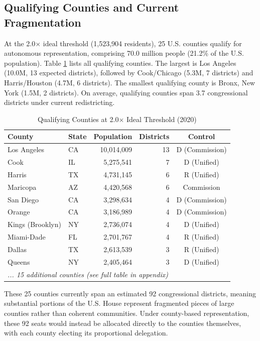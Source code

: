\subsection{Qualifying Counties and Current Fragmentation}

At the 2.0$\times$ ideal threshold (1,523,904 residents), 25 U.S. counties qualify for autonomous representation, comprising 70.0 million people (21.2\% of the U.S. population). Table \ref{tab:qualifying} lists all qualifying counties. The largest is Los Angeles (10.0M, 13 expected districts), followed by Cook/Chicago (5.3M, 7 districts) and Harris/Houston (4.7M, 6 districts). The smallest qualifying county is Bronx, New York (1.5M, 2 districts). On average, qualifying counties span 3.7 congressional districts under current redistricting.

\begin{table}[h]
\centering
\caption{Qualifying Counties at 2.0$\times$ Ideal Threshold (2020)}
\label{tab:qualifying}
\begin{tabular}{llrrc}
\toprule
County & State & Population & Districts & Control \\
\midrule
Los Angeles & CA & 10,014,009 & 13 & D (Commission) \\
Cook & IL & 5,275,541 & 7 & D (Unified) \\
Harris & TX & 4,731,145 & 6 & R (Unified) \\
Maricopa & AZ & 4,420,568 & 6 & Commission \\
San Diego & CA & 3,298,634 & 4 & D (Commission) \\
Orange & CA & 3,186,989 & 4 & D (Commission) \\
Kings (Brooklyn) & NY & 2,736,074 & 4 & D (Unified) \\
Miami-Dade & FL & 2,701,767 & 4 & R (Unified) \\
Dallas & TX & 2,613,539 & 3 & R (Unified) \\
Queens & NY & 2,405,464 & 3 & D (Unified) \\
\midrule
\multicolumn{5}{l}{\emph{... 15 additional counties (see full table in appendix)}} \\
\bottomrule
\end{tabular}
\end{table}

These 25 counties currently span an estimated 92 congressional districts, meaning substantial portions of the U.S. House represent fragmented pieces of large counties rather than coherent communities. Under county-based representation, these 92 seats would instead be allocated directly to the counties themselves, with each county electing its proportional delegation.

